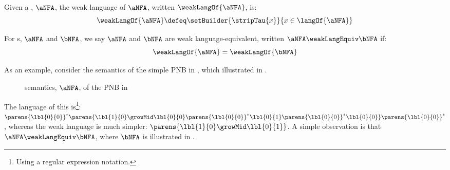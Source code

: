 \begin{definition}
    Given a \NFAB{\aN}{\bN}, $\aNFA$, the weak language of $\aNFA$, written
    $\weakLangOf{\aNFA}$, is:
    \[
        \weakLangOf{\aNFA} \defeq \setBuilder{\stripTau{x}}{x \in \langOf{\aNFA}}
    \]
\end{definition}

\begin{definition}
    For \NFAB{\aN}{\bN}s, $\aNFA$ and $\bNFA$, we say $\aNFA$ and $\bNFA$ are
    weak language-equivalent, written $\aNFA \weakLangEquiv \bNFA$ if:
    \[
    \weakLangOf{\aNFA} = \weakLangOf{\bNFA}
    \]
\end{definition}

As an example, consider the \TNFA{} semantics of the simple PNB in
, which illustrated in .

\begin{figure}[ht]
    \centering
    \caption{ semantics, $\aNFA$, of the PNB in }
    \label{fig:examplePNBTNFA}
\end{figure}

The language of this \TNFA{} is\footnote{Using a regular expression notation.}:
$\parens{\lbl{0}{0}}^\ast\parens{\lbl{1}{0}\growMid\lbl{0}{0}\parens{\lbl{0}{0}}^\ast\lbl{0}{1}\parens{\lbl{0}{0}}^\ast\lbl{0}{0}}\parens{\lbl{0}{0}}^\ast$,
whereas the weak language is much simpler:
$\parens{\lbl{1}{0}\growMid\lbl{0}{1}}$. A simple observation is that $\aNFA
\weakLangEquiv \bNFA$, where $\bNFA$ is illustrated in
.

